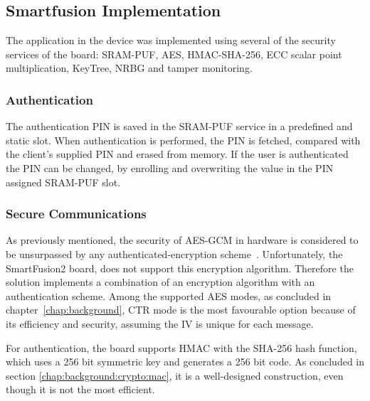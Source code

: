 \subsection{Smartfusion Implementation}\label{chap:implementation:app:board}

The application in the device was implemented using several of the security services of the board: SRAM-PUF, AES, HMAC-SHA-256, ECC scalar point multiplication, KeyTree, \ac{NRBG} and tamper monitoring.

\subsubsection*{Authentication}

The authentication PIN is saved in the SRAM-PUF service in a predefined and static slot. When authentication is performed, the PIN is fetched, compared with the client's supplied PIN and erased from memory.
If the user is authenticated the PIN can be changed, by enrolling and overwriting the value in the PIN assigned SRAM-PUF slot.

\subsubsection*{Secure Communications}

As previously mentioned, the security of \ac{AES}-\ac{GCM} in hardware is considered to be unsurpassed by any authenticated-encryption scheme~\cite{aesmodes}.
Unfortunately, the SmartFusion2 board, does not support this encryption algorithm.
Therefore the solution implements a combination of an encryption algorithm with an authentication scheme. Among the supported \ac{AES} modes, as concluded in chapter~\ref{chap:background}, CTR mode is the most favourable option because of its efficiency and security, assuming the IV is unique for each message.

For authentication, the board supports \ac{HMAC} with the \ac{SHA}-256 hash function, which uses a 256 bit symmetric key and generates a 256 bit code. As concluded in section \ref{chap:background:crypto:mac}, it is a well-designed construction, even though it is not the most efficient.

